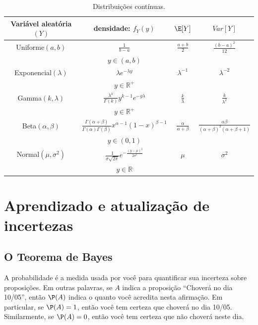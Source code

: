 \begin{table}[h]
 \centering
 \begin{tabular}{|c|c|c|c|}
 \hline
  Variável aleatória $(Y)$ 	& densidade: $f_{Y}(y)$										& $\E[Y]$				& $Var[Y]$								\\
  \hline
  Uniforme$(a,b)$		& $\frac{1}{b-a}$										& $\frac{a+b}{2}$			& $\frac{(b-a)^{2}}{12}$								\\
				& $y \in (a,b)$											&					&									\\
      \hline
  Exponencial$(\lambda)$	& $\lambda e^{-\lambda y}$							& $\lambda^{-1}$				& $\lambda^{-2}$ \\
				& $y \in \mathbb{R}^{+}$									&					&									\\
      \hline
  Gamma$(k,\lambda)$		& $\frac{\lambda^{k}}{\Gamma(k)} y^{k-1} e^{-y\lambda}$				& $\frac{k}{\lambda}$				& $\frac{k} {\lambda^{2}}$							\\
				& $y \in \mathbb{R}^{+}$									&					&									\\
      \hline
  Beta$(\alpha,\beta)$	& $\frac{\Gamma(\alpha+\beta)}{\Gamma(\alpha)\Gamma(\beta)} x^{\alpha-1} (1-x)^{\beta-1}$	& $\frac{\alpha}{\alpha+\beta}$	& $\frac{\alpha \beta}{(\alpha + \beta)^2 (\alpha + \beta +1)}$ 						\\
				& $y \in (0,1)$											&					&									\\
      \hline
  Normal$(\mu,\sigma^{2})$	& $\frac{1}{\sigma \sqrt{2\pi}} e^{-\frac{(y-\mu)^{2}}{2\sigma^{2}}}$				& $\mu$					& $\sigma^{2}$								\\
				& $y \in \mathbb{R}$										&					&									\\
      \hline
 \end{tabular}
 \caption{Distribuições contínuas.}
 \label{continuous-distributions}
\end{table}


\textsl{}\section{Aprendizado e atualização de incertezas}

\subsection{O Teorema de Bayes}

A probabilidade é a medida usada por você para 
quantificar sua incerteza sobre proposições.
Em outras palavras, se $A$ indica a 
proposição ``Choverá no dia 10/05'', então 
$\P(A)$ indica o quanto você acredita nesta afirmação.
Em particular, se $\P(A)=1$, então 
você tem certeza que choverá no dia 10/05.
Similarmente, se $\P(A)=0$, então 
você tem certeza que não choverá neste dia.

